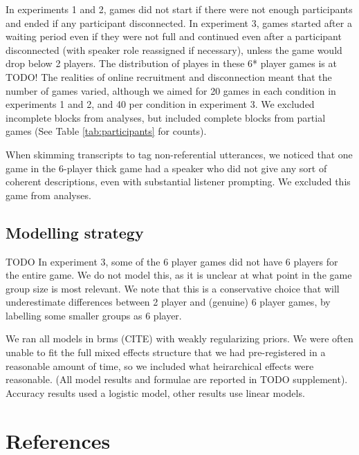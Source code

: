 \documentclass[
  english,
  a4paper,
]{article}
\begin{document}
In experiments 1 and 2, games did not start if there were not enough participants and ended if any participant disconnected. In experiment 3, games started after a waiting period even if they were not full and continued even after a participant disconnected (with speaker role reassigned if necessary), unless the game would drop below 2 players. The distribution of playes in these 6* player games is at TODO! The realities of online recruitment and disconnection meant that the number of games varied, although we aimed for 20 games in each condition in experiments 1 and 2, and 40 per condition in experiment 3. We excluded incomplete blocks from analyses, but included complete blocks from partial games (See Table \ref{tab:participants} for counts).

When skimming transcripts to tag non-referential utterances, we noticed that one game in the 6-player thick game had a speaker who did not give any sort of coherent descriptions, even with substantial listener prompting. We excluded this game from analyses.

\hypertarget{modelling-strategy}{%
\subsection{Modelling strategy}\label{modelling-strategy}}

TODO
In experiment 3, some of the 6 player games did not have 6 players for the entire game. We do not model this, as it is unclear at what point in the game group size is most relevant. We note that this is a conservative choice that will underestimate differences between 2 player and (genuine) 6 player games, by labelling some smaller groups as 6 player.

We ran all models in brms (CITE) with weakly regularizing priors. We were often unable to fit the full mixed effects structure that we had pre-registered in a reasonable amount of time, so we included what heirarchical effects were reasonable. (All model results and formulae are reported in TODO supplement). Accuracy results used a logistic model, other results use linear models.

\hypertarget{references}{%
\section{References}\label{references}}

\setlength{\parindent}{-0.1in} 
\setlength{\leftskip}{0.125in}

\noindent
\end{document}
